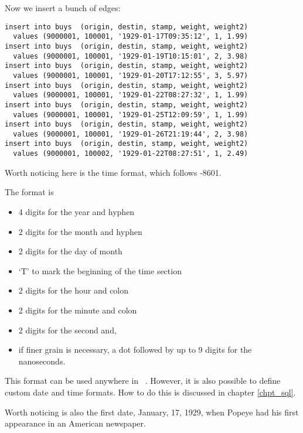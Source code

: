 Now we insert a bunch of edges:

\begin{sqlcode}
\begin{lstlisting}
insert into buys  (origin, destin, stamp, weight, weight2)
  values (9000001, 100001, '1929-01-17T09:35:12', 1, 1.99)
insert into buys  (origin, destin, stamp, weight, weight2)
  values (9000001, 100001, '1929-01-19T10:15:01', 2, 3.98)
insert into buys  (origin, destin, stamp, weight, weight2)
  values (9000001, 100001, '1929-01-20T17:12:55', 3, 5.97)
insert into buys  (origin, destin, stamp, weight, weight2)
  values (9000001, 100001, '1929-01-22T08:27:32', 1, 1.99)
insert into buys  (origin, destin, stamp, weight, weight2)
  values (9000001, 100001, '1929-01-25T12:09:59', 1, 1.99)
insert into buys  (origin, destin, stamp, weight, weight2)
  values (9000001, 100001, '1929-01-26T21:19:44', 2, 3.98)
insert into buys  (origin, destin, stamp, weight, weight2)
  values (9000001, 100002, '1929-01-22T08:27:51', 1, 2.49)
\end{lstlisting}
\end{sqlcode}

\begin{minipage}{\textwidth}
Worth noticing here is the time format,
which follows -8601.

The format is
\begin{itemize}
\item 4 digits for the year and hyphen
\item 2 digits for the month and hyphen
\item 2 digits for the day of month
\item `T' to mark the beginning of the time section
\item 2 digits for the hour and colon
\item 2 digits for the minute and colon
\item 2 digits for the second and,
\item if finer grain is necessary,
a dot followed by up to 9 digits
for the nanoseconds.
\end{itemize}
\end{minipage}

This format can be used anywhere in \nowdb\ \sql.
However, it is also possible to define custom
date and time formats. How to do this is discussed
in chapter \ref{chpt_sql}.

Worth noticing is also the first date,
January, 17, 1929, when Popeye had his first
appearance in an American newspaper.

